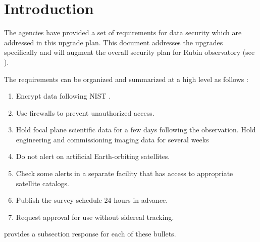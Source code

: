 \section{Introduction}

The agencies have provided a set of requirements for data security which are addressed in this upgrade plan.  This document addresses the upgrades specifically and will augment the overall security plan for Rubin observatory (see ).

The requirements can be organized and summarized at a high level as follows :
\begin{enumerate}

\item	Encrypt data following \gls{NIST} .
\item	Use firewalls to prevent unauthorized  access.
\item	Hold focal plane scientific data for a few days following the observation. Hold engineering and commissioning imaging data for several weeks
\item	Do not alert on artificial Earth-orbiting satellites.
\item	Check some alerts in a separate facility that has access to appropriate satellite catalogs.
\item	Publish the survey schedule 24 hours in advance.
\item	Request approval for use  without sidereal tracking.

\end{enumerate}


 provides a subsection response for each of these bullets.
